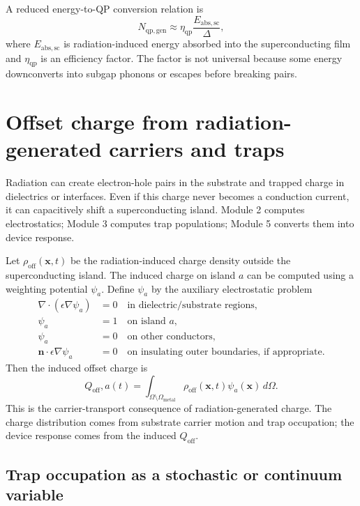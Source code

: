 \documentclass[11pt]{article}
\newcommand{\Om}{\Omega}
\newcommand{\x}{\bm{x}}
\newcommand{\nvecb}{\bm{n}}
\newcommand{\DeltaSC}{\Delta}
\newcommand{\Qoff}{Q_{\mathrm{off}}}
\newcommand{\rhooff}{\rho_{\mathrm{off}}}
\newcommand{\wpot}{\psi}
\begin{document}
A reduced energy-to-QP conversion relation is
\begin{equation}
N_{\mathrm{qp,gen}} \approx \eta_{\mathrm{qp}}\frac{E_{\mathrm{abs,sc}}}{\DeltaSC},
\end{equation}
where \(E_{\mathrm{abs,sc}}\) is radiation-induced energy absorbed into the superconducting film and \(\eta_{\mathrm{qp}}\) is an efficiency factor. The factor is not universal because some energy downconverts into subgap phonons or escapes before breaking pairs.

\section{Offset charge from radiation-generated carriers and traps}

Radiation can create electron-hole pairs in the substrate and trapped charge in dielectrics or interfaces. Even if this charge never becomes a conduction current, it can capacitively shift a superconducting island. Module 2 computes electrostatics; Module 3 computes trap populations; Module 5 converts them into device response.

Let \(\rhooff(\x,t)\) be the radiation-induced charge density outside the superconducting island. The induced charge on island \(a\) can be computed using a weighting potential \(\wpot_a\). Define \(\wpot_a\) by the auxiliary electrostatic problem
\begin{align}
\nabla\cdot(\epsilon\nabla \wpot_a)&=0 \quad \text{in dielectric/substrate regions},\\
\wpot_a&=1 \quad \text{on island } a,\\
\wpot_a&=0 \quad \text{on other conductors},\\
\nvecb\cdot\epsilon\nabla\wpot_a&=0 \quad \text{on insulating outer boundaries, if appropriate}.
\end{align}
Then the induced offset charge is
\begin{equation}
\Qoff,a(t)=\int_{\Om\setminus \Omega_{\mathrm{metal}}} \rhooff(\x,t)\wpot_a(\x)\,d\Om.
\label{eq:weighting_offset}
\end{equation}
This is the carrier-transport consequence of radiation-generated charge. The charge distribution comes from substrate carrier motion and trap occupation; the device response comes from the induced \(\Qoff\).

\subsection{Trap occupation as a stochastic or continuum variable}
\end{document}

